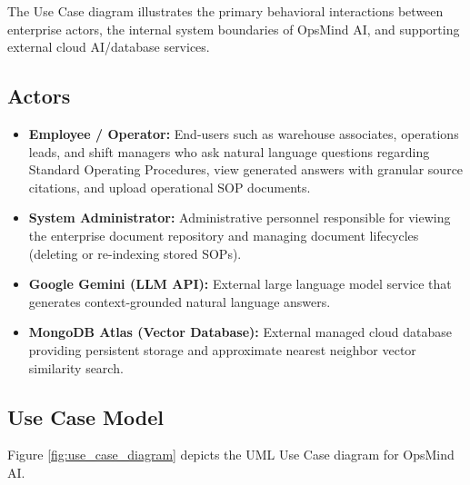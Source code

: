 The Use Case diagram illustrates the primary behavioral interactions between enterprise actors, the internal system boundaries of OpsMind AI, and supporting external cloud AI/database services.

\subsection{Actors}
\begin{itemize}
    \item \textbf{Employee / Operator:} End-users such as warehouse associates, operations leads, and shift managers who ask natural language questions regarding Standard Operating Procedures, view generated answers with granular source citations, and upload operational SOP documents.
    \item \textbf{System Administrator:} Administrative personnel responsible for viewing the enterprise document repository and managing document lifecycles (deleting or re-indexing stored SOPs).
    \item \textbf{Google Gemini (LLM API):} External large language model service that generates context-grounded natural language answers.
    \item \textbf{MongoDB Atlas (Vector Database):} External managed cloud database providing persistent storage and approximate nearest neighbor vector similarity search.
\end{itemize}

\subsection{Use Case Model}
Figure \ref{fig:use_case_diagram} depicts the UML Use Case diagram for OpsMind AI.

